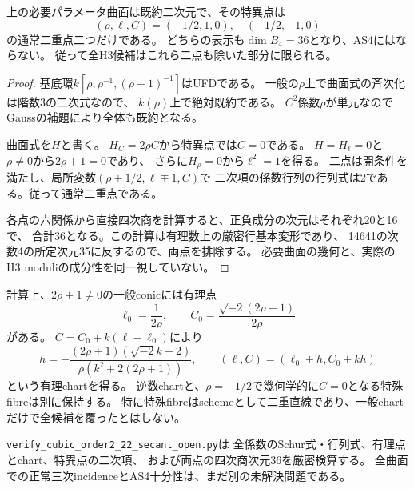 \begin{proposition}\label{prop:h3-order2-22-secant-open-nodes}
上の必要パラメータ曲面は既約二次元で、その特異点は
\[
 (\rho,\ell,C)=(-1/2,1,0),\quad(-1/2,-1,0)
\]
の通常二重点二つだけである。
どちらの表示も$\dim B_4=36$となり、AS4にはならない。
従って全H3候補はこれら二点も除いた部分に限られる。
\end{proposition}
\begin{proof}
基底環$k[\rho,\rho^{-1},(\rho+1)^{-1}]$はUFDである。
一般の$\rho$上で曲面式の斉次化は階数3の二次式なので、
$k(\rho)$上で絶対既約である。
$C^2$係数$\rho$が単元なのでGaussの補題により全体も既約となる。

曲面式を$H$と書く。
$H_C=2\rho C$から特異点では$C=0$である。
$H=H_\ell=0$と$\rho\ne0$から$2\rho+1=0$であり、
さらに$H_\rho=0$から$\ell^2=1$を得る。
二点は開条件を満たし、局所変数$(\rho+1/2,\ell\mp1,C)$で
二次項の係数行列の行列式は2である。従って通常二重点である。

各点の六関係から直接四次商を計算すると、正負成分の次元はそれぞれ20と16で、
合計36となる。この計算は有理数上の厳密行基本変形であり、
14641の次数4の所定次元35に反するので、両点を排除する。
必要曲面の幾何と、実際のH3 moduliの成分性を同一視していない。
\end{proof}

計算上、$2\rho+1\ne0$の一般conicには有理点
\[
 \ell_0=\frac1{2\rho},\qquad
 C_0=\frac{\sqrt{-2}(2\rho+1)}{2\rho}
\]
がある。
$C=C_0+k(\ell-\ell_0)$により
\[
 h=-\frac{(2\rho+1)(\sqrt{-2}k+2)}{\rho(k^2+2(2\rho+1))},\qquad
 (\ell,C)=(\ell_0+h,C_0+kh)
\]
という有理chartを得る。
逆数chartと、$\rho=-1/2$で幾何学的に$C=0$となる特殊fibreは別に保持する。
特に特殊fibreはschemeとして二重直線であり、一般chartだけで全候補を覆ったとはしない。

\texttt{verify\_cubic\_order2\_22\_secant\_open.py}は
全係数のSchur式・行列式、有理点とchart、特異点の二次項、
および両点の四次商次元36を厳密検算する。
全曲面での正常三次incidenceとAS4十分性は、まだ別の未解決問題である。

